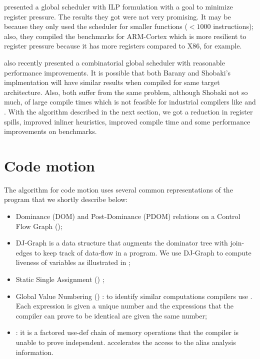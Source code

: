 \documentclass[acmlarge,review,anonymous]{acmart}\settopmatter{printfolios=true}
\begin{document}
\citet{barany2013} presented a global scheduler with ILP formulation with
a goal to minimize register pressure. The results they got were not very
promising. It may be because they only used the scheduler for smaller functions
($<1000$ instructions); also, they compiled the benchmarks for ARM-Cortex which
is more resilient to register pressure because it has more registers compared to
X86, for example.

\citet{shobaki2013} also recently presented a combinatorial global
scheduler with reasonable performance improvements. It is possible that both
Barany and Shobaki's implmentation will have similar results when compiled for
same target architecture. Also, both suffer from the same problem, although
Shobaki not so much, of large compile times which is not feasible for industrial
compilers like \GCC{} and \LLVM{}. With the algorithm described in the next
section, we got a reduction in register spills, improved inliner heuristics,
improved compile time and some performance improvements on \SPEC{} benchmarks.


\section{Code motion}

The algorithm for code motion uses several common representations of the
program that we shortly describe below:
\begin{itemize}
\item Dominance (DOM) and Post-Dominance (PDOM) relations \cite{dragonbook} on a
  Control Flow Graph (\CFG{});
\item DJ-Graph \cite{Sreedhar1996} is a data structure that augments the
  dominator tree with join-edges to keep track of data-flow in a program. We use
  DJ-Graph to compute liveness of variables as illustrated in \cite{das2012};
\item Static Single Assignment (\SSA{}) \cite{cytron};
\item Global Value Numbering (\GVN{}) \cite{rosen1988global,click1995global}: to
  identify similar computations compilers use \GVN{}.  Each expression is given
  a unique number and the expressions that the compiler can prove to be
  identical are given the same number;
\item \MemorySSA{} \cite{novillo2007memory}: it is a factored use-def chain of
  memory operations that the compiler is unable to prove
  independent. \MemorySSA{} accelerates the access to the alias analysis
  information.
\end{itemize}
\end{document}
